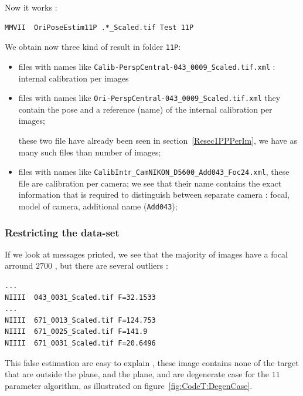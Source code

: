 Now it works :

\begin{lstlisting}
MMVII  OriPoseEstim11P .*_Scaled.tif Test 11P
\end{lstlisting}

We obtain now three kind of result in folder {\tt 11P}:

\begin{itemize}
	\item files with names like  {\tt Calib-PerspCentral-043\_0009\_Scaled.tif.xml} :  internal calibration per images

	\item files with  names like {\tt Ori-PerspCentral-043\_0009\_Scaled.tif.xml} they contain the pose and
		a reference (name) of the internal calibration per images;

	       these two file have already been seen in section~\ref{Resec1PPPerIm}, we have as many such files
               than number of images;


	\item files with  names like {\tt CalibIntr\_CamNIKON\_D5600\_Add043\_Foc24.xml}, these file  are calibration
              per camera;  we see that their name contains the exact information that is required to distinguish between 
              separate camera : focal, model of camera, additional name ({\tt Add043});

\end{itemize}


\subsubsection{Restricting the data-set}

If we look at messages printed, we see that the majority
of images have a focal arround $2700$ , but there are several
outliers :

\begin{lstlisting}
...
NIIII  043_0031_Scaled.tif F=32.1533
...
NIIII  671_0013_Scaled.tif F=124.753
NIIII  671_0025_Scaled.tif F=141.9
NIIII  671_0031_Scaled.tif F=20.6496
\end{lstlisting}


This false estimation are easy to explain , these image contains none of the target that are outside
the plane, and the plane, and are degenerate case for the $11$ parameter algorithm,
as illustrated on figure~\ref{fig:CodeT:DegenCase}.

